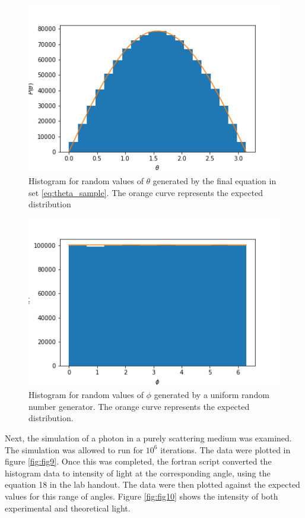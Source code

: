\documentclass[twocolumn]{article}
\begin{document}
\begin{figure}
\centering
\includegraphics[width=\linewidth]{fig7}
\caption{Histogram for random values of $\theta$ generated by the final equation in set \ref{eq:theta_sample}. The orange curve represents the expected distribution}
\label{fig:fig7}
\end{figure}

\begin{figure}
	\centering
	\includegraphics[width=\linewidth]{fig8}
	\caption{Histogram for random values of $\phi$ generated by a uniform random number generator. The orange curve represents the expected distribution.}
	\label{fig:fig8}
\end{figure}

Next, the simulation of a photon in a purely scattering medium was examined. The simulation was allowed to run for $10^6$ iterations. The data were plotted in figure \ref{fig:fig9}. Once this was completed, the fortran script converted the histogram data to intensity of light at the corresponding angle, using the equation 18 in the lab handout. The data were then plotted against the expected values for this range of angles. Figure \ref{fig:fig10} shows the intensity of both experimental and theoretical light.
\end{document}
